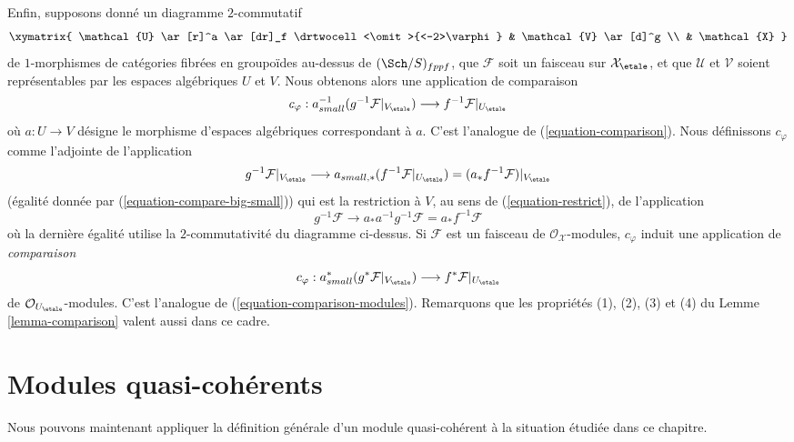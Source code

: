 \medskip\noindent
Enfin, supposons donné un diagramme $2$-commutatif
$$
\xymatrix{
\mathcal{U} \ar[r]^a \ar[dr]_f \drtwocell<\omit>{<-2>\varphi} &
\mathcal{V} \ar[d]^g \\
& \mathcal{X}
}
$$
de $1$-morphismes de catégories fibrées en groupoïdes au-dessus de $(\Sch/S)_{fppf}$,
que $\mathcal{F}$ soit un faisceau sur $\mathcal{X}_\etale$,
et que $\mathcal{U}$ et $\mathcal{V}$ soient représentables par les espaces algébriques
$U$ et $V$. Nous obtenons alors une application de comparaison
\begin{equation}
\label{equation-comparison-algebraic-spaces}
c_\varphi : a_{small}^{-1}(g^{-1}\mathcal{F}|_{V_\etale})
\longrightarrow
f^{-1}\mathcal{F}|_{U_\etale}
\end{equation}
où $a : U \to V$ désigne le morphisme d'espaces algébriques correspondant
à $a$. C'est l'analogue de (\ref{equation-comparison}). Nous définissons
$c_\varphi$ comme l'adjointe de l'application
$$
g^{-1}\mathcal{F}|_{V_\etale}
\longrightarrow
a_{small, *}(f^{-1}\mathcal{F}|_{U_\etale}) =
(a_*f^{-1}\mathcal{F})|_{V_\etale}
$$
(égalité donnée par (\ref{equation-compare-big-small}))
qui est la restriction à $V$, au sens de (\ref{equation-restrict}), de l'application
$$
g^{-1}\mathcal{F} \to a_*a^{-1}g^{-1}\mathcal{F} = a_*f^{-1}\mathcal{F}
$$
où la dernière égalité utilise la $2$-commutativité du diagramme ci-dessus.
Si $\mathcal{F}$ est un faisceau de $\mathcal{O}_\mathcal{X}$-modules,
$c_\varphi$ induit une application de {\it comparaison}
\begin{equation}
\label{equation-comparison-algebraic-spaces-modules}
c_\varphi : a_{small}^*(g^*\mathcal{F}|_{V_\etale})
\longrightarrow
f^*\mathcal{F}|_{U_\etale}
\end{equation}
de $\mathcal{O}_{U_\etale}$-modules. C'est l'analogue de
(\ref{equation-comparison-modules}).
Remarquons que les propriétés (1), (2), (3) et (4) du
Lemme \ref{lemma-comparison}
valent aussi dans ce cadre.












\section{Modules quasi-cohérents}
\label{section-quasi-coherent}

\noindent
Nous pouvons maintenant appliquer la définition générale d'un module
quasi-cohérent à la situation étudiée dans ce chapitre.


